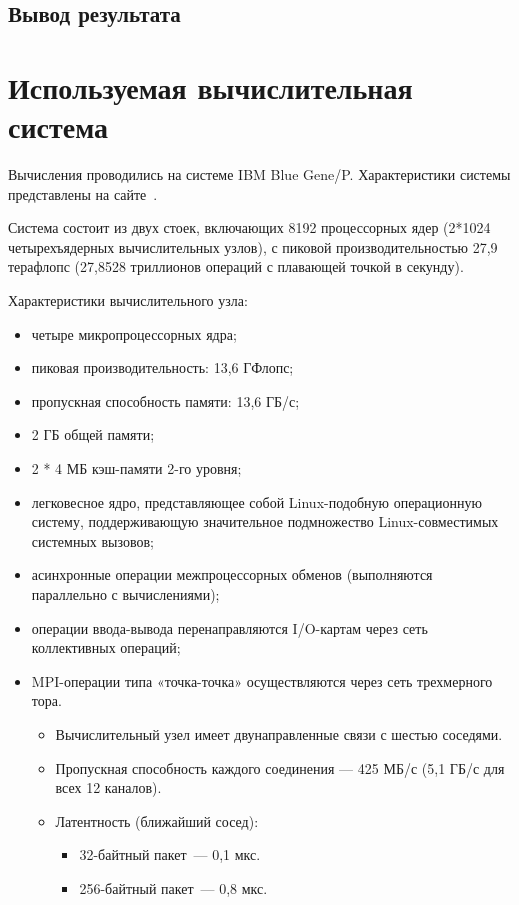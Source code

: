 \documentclass[oneside,final,14pt]{extreport}
\begin{document}
\section*{Вывод результата}

\chapter*{Используемая вычислительная система}

Вычисления проводились на системе IBM Blue Gene/P.
Характеристики системы представлены на сайте~\cite{bluegene}.

Система состоит из двух стоек, включающих 8192 процессорных ядер
(2*1024 четырехъядерных вычислительных узлов), с пиковой производительностью
27,9 терафлопс (27,8528 триллионов операций с плавающей точкой в секунду).

Характеристики вычислительного узла:

\begin{itemize}
    \item четыре микропроцессорных ядра;
    \item пиковая производительность: 13,6 ГФлопс;
    \item пропускная способность памяти: 13,6 ГБ/с;
    \item 2 ГБ общей памяти;
    \item 2 * 4 МБ кэш-памяти 2-го уровня;
    \item легковесное ядро, представляющее собой Linux-подобную операционную систему,
        поддерживающую значительное подмножество Linux-совместимых системных вызовов;
    \item асинхронные операции межпроцессорных обменов (выполняются параллельно с вычислениями);
    \item операции ввода-вывода перенаправляются I/O-картам через сеть коллективных операций;
    \item MPI-операции типа «точка-точка» осуществляются через сеть трехмерного тора.
        \begin{itemize}
            \item Вычислительный узел имеет двунаправленные связи с шестью соседями.
            \item Пропускная способность каждого соединения — 425 МБ/с (5,1 ГБ/с для всех 12
        каналов).
            \item Латентность (ближайший сосед):
                \begin{itemize}
                    \item 32-байтный пакет~--- 0,1 мкс.
                    \item 256-байтный пакет~--- 0,8 мкс.
                \end{itemize}
        \end{itemize}
\end{itemize}
\end{document}
